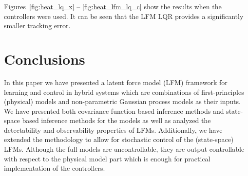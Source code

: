\documentclass[journal]{IEEEtran}
\newcommand{\simo}[1]{{\color{red}#1}}
\begin{document}
Figures~\ref{fig:heat_lq_x} -- \ref{fig:heat_lfm_lq_c} show the results when the controllers were used. It can be seen that the LFM LQR provides a significantly smaller tracking error. 





\section{Conclusions}
In this paper we have presented a latent force model (LFM) framework for learning and control in hybrid systems which are combinations of first-principles (physical) models and non-parametric Gaussian process models as their inputs. We have presented both covariance function based inference methods and state-space based inference methods for the models as well as analyzed the detectability and observability properties of LFMs. Additionally, we have extended the methodology to allow for stochastic control of the (state-space) LFMs. Although the full models are uncontrollable, they are output controllable with respect to the physical model part which is enough for practical implementation of the controllers.



%
\end{document}
